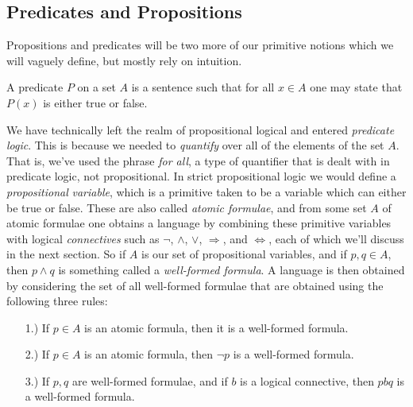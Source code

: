     \subsection{Predicates and Propositions}
        Propositions and predicates will be two more of our primitive notions
        which we will vaguely define, but mostly rely on intuition.
        \begin{definition}
            \label{def:Predicate}%
            A \gls{predicate} $P$ on a \gls{set} $A$ is a sentence such that for
            all $x\in{A}$ one may state that $P(x)$ is either true or false.%
        \end{definition}
        We have technically left the realm of propositional logical and entered
        \textit{predicate logic}.
        This is because we needed to \textit{quantify} over all of the elements
        of the set $A$. That is, we've used the phrase \textit{for all}, a type
        of quantifier that is dealt with in predicate logic, not propositional.
        In strict propositional logic we would define a \textit{propositional}
        \textit{variable}, which is a primitive
        taken to be a variable which can either be true or false. These are also
        called \textit{atomic formulae}, and from some set
        $A$ of atomic formulae one obtains a language by combining these
        primitive variables with logical
        \textit{connectives} such as $\neg$,
        $\land$, $\lor$, $\Rightarrow$, and $\Leftrightarrow$, each of which
        we'll discuss in the next section. So if $A$ is our set of propositional
        variables, and if $p,q\in{A}$, then $p\land{q}$ is something called a
        \textit{well-formed formula}. A language is
        then obtained by considering the set of all well-formed formulae that
        are obtained using the following three rules:
        \begin{itemize}
            \item[1.)] If $p\in{A}$ is an atomic formula, then it is a
                       well-formed formula.
            \item[2.)] If $p\in{A}$ is an atomic formula, then $\neg{p}$ is a
                       well-formed formula.
            \item[3.)] If $p,q$ are well-formed formulae, and if $b$ is a
                       logical connective, then $pbq$ is a well-formed formula.
        \end{itemize}
